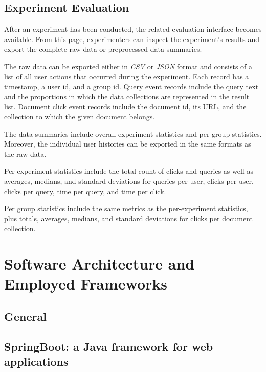 \documentclass[a4paper]{usiinfbachelorproject}
\begin{document}
\subsection{Experiment Evaluation} \label{sec:designExpEval}

After an experiment has been conducted, the  related evaluation interface becomes available. From this page,
experimenters can inspect the experiment's results and export  the complete raw data
or preprocessed data summaries.

The raw data can be exported either in \emph{CSV} or \emph{JSON} format and consists of a list of all user actions that occurred during the experiment. 
Each record has a timestamp, a user id, and a group id. Query event records include the query text and the proportions in which
the data collections are represented  in the result list. Document click event records include the document id, its URL, and
the collection to which the given document belongs.

The data summaries include overall experiment statistics and per-group statistics. Moreover, the individual user histories can be 
exported in the same formats as the raw data.


Per-experiment statistics include the total count of clicks and queries as well as averages, medians, and standard deviations
for queries per user, clicks per user, clicks per query, time per query, and time per click.

Per group statistics include the same metrics as the per-experiment statistics, plus totals, averages, medians, and standard deviations
for clicks per document collection.



\section{\textbf{Software Architecture and Employed Frameworks}} \label{sec:arch}

\subsection{General} \label{sec:archGeneral}

\subsection{SpringBoot: a Java framework for web applications} \label{sec:archSpring}
\end{document}
